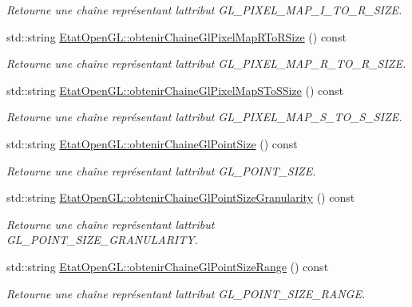 \begin{DoxyCompactItemize}
\begin{DoxyCompactList}\small\item\em Retourne une chaîne représentant l\textquotesingle{}attribut G\+L\+\_\+\+P\+I\+X\+E\+L\+\_\+\+M\+A\+P\+\_\+\+I\+\_\+\+T\+O\+\_\+\+R\+\_\+\+S\+I\+Z\+E. \end{DoxyCompactList}\item 
std\+::string \hyperlink{group__utilitaire_ga315fd9fa34e26c259ce76e33ddadc11b}{Etat\+Open\+G\+L\+::obtenir\+Chaine\+Gl\+Pixel\+Map\+R\+To\+R\+Size} () const 
\begin{DoxyCompactList}\small\item\em Retourne une chaîne représentant l\textquotesingle{}attribut G\+L\+\_\+\+P\+I\+X\+E\+L\+\_\+\+M\+A\+P\+\_\+\+R\+\_\+\+T\+O\+\_\+\+R\+\_\+\+S\+I\+Z\+E. \end{DoxyCompactList}\item 
std\+::string \hyperlink{group__utilitaire_ga5d77ae2d820ab8304af841033ee957ef}{Etat\+Open\+G\+L\+::obtenir\+Chaine\+Gl\+Pixel\+Map\+S\+To\+S\+Size} () const 
\begin{DoxyCompactList}\small\item\em Retourne une chaîne représentant l\textquotesingle{}attribut G\+L\+\_\+\+P\+I\+X\+E\+L\+\_\+\+M\+A\+P\+\_\+\+S\+\_\+\+T\+O\+\_\+\+S\+\_\+\+S\+I\+Z\+E. \end{DoxyCompactList}\item 
std\+::string \hyperlink{group__utilitaire_gad02efc6cfc989e454b9cc91443fef303}{Etat\+Open\+G\+L\+::obtenir\+Chaine\+Gl\+Point\+Size} () const 
\begin{DoxyCompactList}\small\item\em Retourne une chaîne représentant l\textquotesingle{}attribut G\+L\+\_\+\+P\+O\+I\+N\+T\+\_\+\+S\+I\+Z\+E. \end{DoxyCompactList}\item 
std\+::string \hyperlink{group__utilitaire_ga77ea6a1da567197d644dcd11743f67a8}{Etat\+Open\+G\+L\+::obtenir\+Chaine\+Gl\+Point\+Size\+Granularity} () const 
\begin{DoxyCompactList}\small\item\em Retourne une chaîne représentant l\textquotesingle{}attribut G\+L\+\_\+\+P\+O\+I\+N\+T\+\_\+\+S\+I\+Z\+E\+\_\+\+G\+R\+A\+N\+U\+L\+A\+R\+I\+T\+Y. \end{DoxyCompactList}\item 
std\+::string \hyperlink{group__utilitaire_gab2553c47e6d7fa315b61ab5dcdb1506e}{Etat\+Open\+G\+L\+::obtenir\+Chaine\+Gl\+Point\+Size\+Range} () const 
\begin{DoxyCompactList}\small\item\em Retourne une chaîne représentant l\textquotesingle{}attribut G\+L\+\_\+\+P\+O\+I\+N\+T\+\_\+\+S\+I\+Z\+E\+\_\+\+R\+A\+N\+G\+E. \end{DoxyCompactList}\item 

\end{DoxyCompactItemize}
